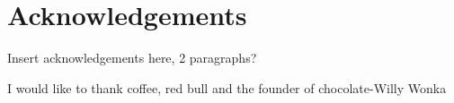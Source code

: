 \documentclass[../main.tex]{subfiles}
\begin{document}
\chapter{Acknowledgements}

Insert acknowledgements here, 2 paragraphs?

I would like to thank coffee, red bull and the founder of chocolate-Willy Wonka 
\end{document}
